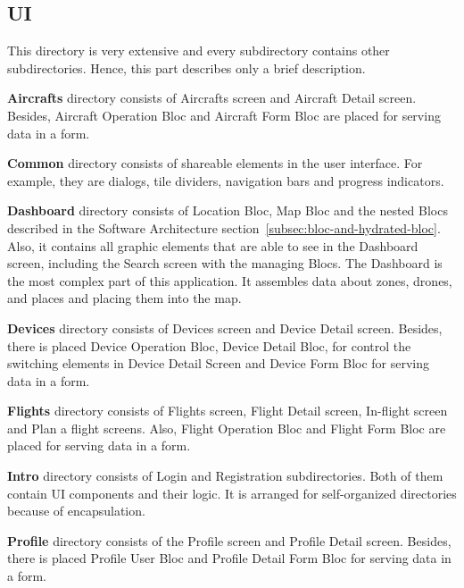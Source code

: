 \subsection{UI}\label{subsec:ui}
This directory is very extensive and every subdirectory contains other subdirectories.
Hence, this part describes only a brief description.


\textbf{Aircrafts} directory consists of Aircrafts screen and Aircraft Detail screen.
Besides, Aircraft Operation Bloc and Aircraft Form Bloc are placed for serving data in a form.


\textbf{Common} directory consists of shareable elements in the user interface.
For example, they are dialogs, tile dividers, navigation bars and progress indicators.


\textbf{Dashboard} directory consists of Location Bloc, Map Bloc and the nested Blocs described in the Software Architecture section~\ref{subsec:bloc-and-hydrated-bloc}.
Also, it contains all graphic elements that are able to see in the Dashboard screen, including the Search screen with the managing Blocs.
The Dashboard is the most complex part of this application.
It assembles data about zones, drones, and places and placing them into the map.


\textbf{Devices} directory consists of Devices screen and Device Detail screen.
Besides, there is placed Device Operation Bloc, Device Detail Bloc, for control the switching elements in Device Detail Screen and Device Form Bloc for serving data in a form.


\textbf{Flights} directory consists of Flights screen, Flight Detail screen, In-flight screen and Plan a flight screens.
Also, Flight Operation Bloc and Flight Form Bloc are placed for serving data in a form.


\textbf{Intro} directory consists of Login and Registration subdirectories.
Both of them contain UI components and their logic.
It is arranged for self-organized directories because of encapsulation.


\textbf{Profile} directory consists of the Profile screen and Profile Detail screen.
Besides, there is placed Profile User Bloc and Profile Detail Form Bloc for serving data in a form.

